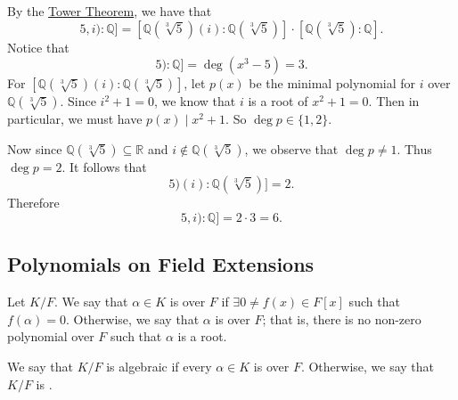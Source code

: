 \documentclass[notoc,notitlepage]{tufte-book}
\begin{document}
\begin{solution}
  By the \hyperref[thm:tower_theorem]{Tower Theorem}, we have that
  \begin{equation*}
    [\mathbb{Q}(\sqrt[3]{5}, i) : \mathbb{Q}] 
      = [\mathbb{Q}(\sqrt[3]{5})(i) : \mathbb{Q}(\sqrt[3]{5})] \cdot [\mathbb{Q}(\sqrt[3]{5}) : \mathbb{Q}].
  \end{equation*}
  Notice that
  \begin{equation*}
    [\mathbb{Q}(\sqrt[3]{5}) : \mathbb{Q}] = \deg ( x^3 - 5 ) = 3.
  \end{equation*}
  For $[\mathbb{Q}(\sqrt[3]{5})(i) : \mathbb{Q}(\sqrt[3]{5})]$, let $p(x)$ be the minimal polynomial for $i$
  over $\mathbb{Q}(\sqrt[3]{5})$. Since $i^2 + 1 = 0$, we know that $i$ is a root of $x^2 + 1 = 0$. Then in
  particular, we must have $p(x) \mid x^2 + 1$. So $\deg p \in \{ 1, 2 \}$.

  Now since $\mathbb{Q}(\sqrt[3]{5}) \subseteq \mathbb{R}$ and $i \notin \mathbb{Q}(\sqrt[3]{5})$, we observe
  that $\deg p \neq 1$. Thus $\deg p = 2$. It follows that
  \begin{equation*}
    [\mathbb{Q}(\sqrt[3]{5})(i) : \mathbb{Q}(\sqrt[3]{5})] = 2.
  \end{equation*}
  Therefore
  \begin{equation*}
    [\mathbb{Q}(\sqrt[3]{5}, i) : \mathbb{Q}]  = 2 \cdot 3 = 6.
  \end{equation*}
\end{solution}


\subsection{Polynomials on Field Extensions}%
\label{sub:polynomials_on_field_extensions}

\begin{defn}\label{defn:algebraic_and_transcendental}
  Let $K / F$. We say that $\alpha \in K$ is  over $F$ if $\exists 0 \neq f(x) \in F[x]$
  such that $f(\alpha) = 0$. Otherwise, we say that $\alpha$ is  over $F$; that is,
  there is no non-zero polynomial over $F$ such that $\alpha$ is a root.

  We say that $K / F$ is algebraic if every $\alpha \in K$ is  over $F$. Otherwise, we
  say that $K / F$ is .
\end{defn}
\end{document}
